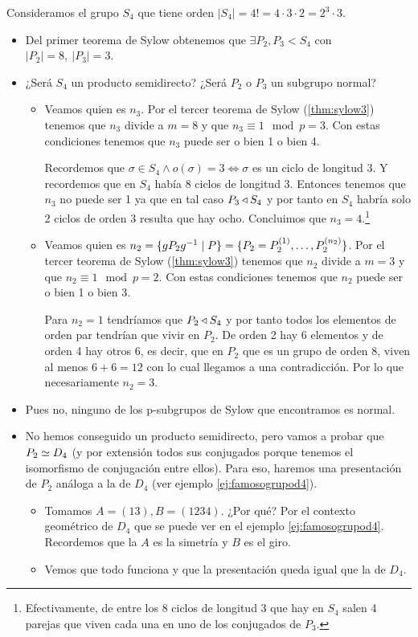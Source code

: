 \begin{ej}
	Consideramos el grupo $S_4$ que tiene orden $|S_4| = 4! = 4\cdot 3 \cdot 2 = 2^3 \cdot 3$.
	\begin{itemize}
		\item Del primer teorema de Sylow obtenemos que $\exists P_2, P_3 < S_4$ con $|P_2| = 8,\ |P_3| = 3$.
		\item ¿Será $S_4$ un producto semidirecto? ¿Será $P_2$ o $P_3$ un subgrupo normal?
		\begin{itemize}
			\item Veamos quien es $n_3$. Por el tercer teorema de Sylow (\ref{thm:sylow3}) tenemos que $n_3$ divide a $m = 8$ y que $n_3 \equiv 1 \mod p = 3$. Con estas condiciones tenemos que $n_3$ puede ser o bien 1 o bien 4.
			
			Recordemos que $\sigma \in S_4 \land o(\sigma) = 3 \iff \sigma$ es un ciclo de longitud 3. Y recordemos que en $S_4$ había 8 ciclos de longitud 3. Entonces tenemos que $n_3$ no puede ser 1 ya que en tal caso $P_3 \mathbin{\triangleleft} S_4$ y por tanto en $S_4$ habría solo 2 ciclos de orden 3 resulta que hay ocho. Concluimos que $n_3 = 4$.\footnote{Efectivamente, de entre los 8 ciclos de longitud 3 que hay en $S_4$ salen 4 parejas que viven cada una en uno de los conjugados de $P_3$.}
			\item Veamos quien es $n_2 = \{gP_2g^{-1} \mid P\} = \{P_2 = P_2^{(1)}, \dots, P_2^{(n_2)}\}$. Por el tercer teorema de Sylow (\ref{thm:sylow3}) tenemos que $n_2$ divide a $m = 3$ y que $n_2 \equiv 1 \mod p = 2$. Con estas condiciones tenemos que $n_2$ puede ser o bien 1 o bien 3.
			
			Para $n_2 = 1$ tendríamos que $P_2 \mathbin{\triangleleft} S_4$ y por tanto todos los elementos de orden par tendrían que vivir en $P_2$. De orden 2 hay 6 elementos y de orden 4 hay otros 6, es decir, que en $P_2$ que es un grupo de orden 8, viven al menos $6 + 6 = 12$ con lo cual llegamos a una contradicción. Por lo que necesariamente $n_2 = 3$.
		\end{itemize}
		\item Pues no, ninguno de los p-subgrupos de Sylow que encontramos es normal.
		\item No hemos conseguido un producto semidirecto, pero vamos a probar que $P_2 \simeq D_4$ (y por extensión todos sus conjugados porque tenemos el isomorfismo de conjugación entre ellos). Para eso, haremos una presentación de $P_2$ análoga a la de $D_4$ (ver ejemplo \ref{ej:famosogrupod4}).
		\begin{itemize}
			\item Tomamos $A = (13), B = (1234)$. ¿Por qué? Por el contexto geométrico de $D_4$ que se puede ver en el ejemplo \ref{ej:famosogrupod4}. Recordemos que la $A$ es la simetría y $B$ es el giro.
			\item Vemos que todo funciona y que la presentación queda igual que la de $D_4$.
		\end{itemize}
	\end{itemize}
\end{ej}



